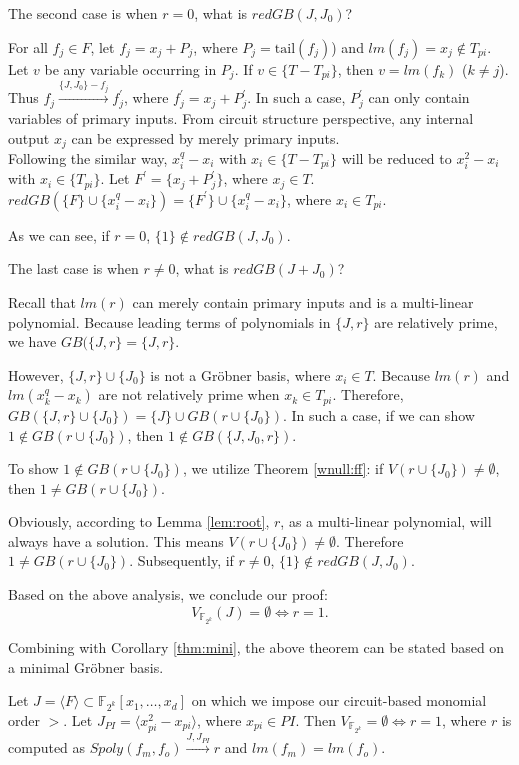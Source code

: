 \begin{Proof}
The second case is when $r=0$, what is $redGB(J,J_0)$? 

For all $f_j \in F$, let $f_j = x_j +P_j$, where $P_j = \text{tail}(f_j)$) and $lm(f_j)=x_j \notin T_{pi}$.
Let $v$ be any variable occurring in $P_j$. If $v\in \{T-T_{pi}\}$, then $v=lm(f_k)$ ($k\neq j$). 
Thus $f_j \xrightarrow{ \{J,J_0\}-f_j }{f_j^{'}}$, where $f_j^{'}=x_j+P_j^{'}$. 
In such a case, $P_j^{'}$ can only contain variables of primary inputs. 
From circuit structure perspective, any internal output $x_j$ can be expressed by merely primary inputs.\\
Following the similar way, $x_i^{q}-x_i$ with $x_i\in \{T-T_{pi}\}$ will be reduced to $x_i^{2}-x_i$ with $x_i\in \{T_{pi}\}$.
Let $F^{'}=\{x_j+P_j^{'}\}$, where $x_j \in T$.
$redGB(\{F\} \cup \{x_i^{q}-x_i\})=\{F^{'}\} \cup \{x_i^{q}-x_i\}$, where $x_i\in T_{pi}$. 

As we can see, if $r=0$, $\{1\} \notin redGB(J,J_0)$.

The last case is when $r \neq 0$, what is $redGB(J+J_{0})$? 

Recall that $lm(r)$ can merely contain primary inputs and is a multi-linear polynomial. 
Because leading terms of polynomials in $\{J,r\}$ are relatively prime, we have $GB(\{J,r\}=\{J,r\}$. 

However, $\{J,r\}\cup \{J_{0}\}$ is not a Gr\"obner basis, where $x_i \in T$. 
Because $lm(r)$ and $lm(x_k^{q}-x_k)$ are not relatively prime when $x_k\in T_{pi}$. 
Therefore, $GB(\{J,r\}\cup \{J_{0}\})=\{J\} \cup GB(r\cup \{J_{0}\})$.
In such a case, if we can show $1 \notin GB(r\cup \{J_{0}\})$, then $1\notin GB(\{J,J_{0},r\})$.

To show $1 \notin GB(r\cup \{J_{0}\})$, we utilize Theorem \ref{wnull:ff}: if $V(r\cup \{J_{0}\})\neq \emptyset$, 
then $1 \neq GB(r\cup \{J_{0}\})$. 

Obviously, according to Lemma \ref{lem:root}, $r$, as a multi-linear polynomial, will always have a solution. This means $V(r\cup \{J_{0}\})\neq \emptyset$. 
Therefore $1 \neq GB(r\cup \{J_{0}\})$. Subsequently, if $r\neq 0$, $\{1\} \notin redGB(J,J_0)$.

Based on the above analysis, we conclude our proof:
\begin{equation}
	V_{\mathbb{F}_{2^k}}(J)=\emptyset \iff r=1.
\end{equation}
\end{Proof}

Combining with Corollary \ref{thm:mini}, the above theorem can be stated based on a minimal Gr\"obner basis.
\begin{Corollary}\label{cor:miter}
Let $J=\langle F \rangle \subset \mathbb{F}_{2^k}[x_{1},\dots,x_{d}]$ 
on which we impose our circuit-based monomial order $>$.
Let $J_{PI}=\langle x_{pi}^{2}-x_{pi}\rangle$, where $x_{pi}\in PI$.
Then $V_{\mathbb{F}_{2^k}}=\emptyset \iff r=1$, where $r$ is computed as 
$Spoly(f_m,f_o) \stackrel{J,J_{PI}}{\longrightarrow} r$ and $lm(f_m)=lm(f_o)$. 
\end{Corollary}

